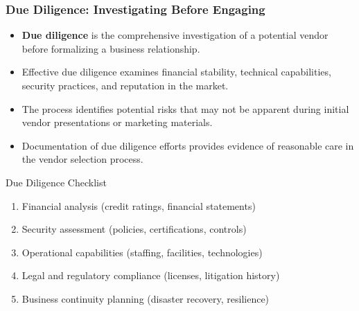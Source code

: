 \documentclass{beamer}
\begin{document}
\begin{frame}
    \frametitle{Due Diligence: Investigating Before Engaging}
    
    \begin{itemize}
        \item \textbf{Due diligence} is the comprehensive investigation of a potential vendor before formalizing a business relationship.
        \item Effective due diligence examines financial stability, technical capabilities, security practices, and reputation in the market.
        \item The process identifies potential risks that may not be apparent during initial vendor presentations or marketing materials.
        \item Documentation of due diligence efforts provides evidence of reasonable care in the vendor selection process.
    \end{itemize}
    
    \begin{block}{Due Diligence Checklist}
        \scriptsize
        \begin{enumerate}
            \item Financial analysis (credit ratings, financial statements)
            \item Security assessment (policies, certifications, controls)
            \item Operational capabilities (staffing, facilities, technologies)
            \item Legal and regulatory compliance (licenses, litigation history)
            \item Business continuity planning (disaster recovery, resilience)
        \end{enumerate}
    \end{block}
\end{frame}
\end{document}
